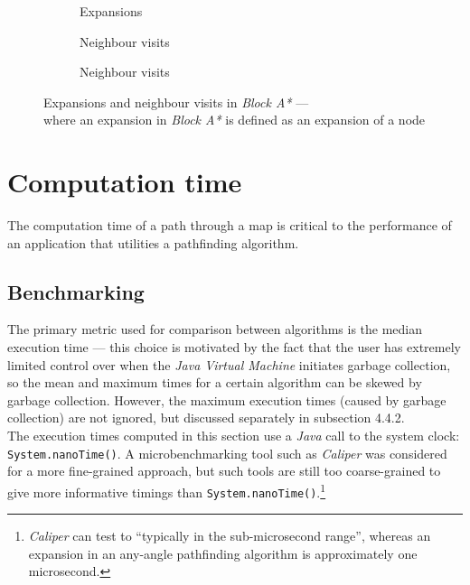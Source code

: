 \documentclass[12pt,notitlepage]{report}
\begin{document}
\begin{figure}
\centering
  \begin{subfigure}{0.32\textwidth}
  \centering
  
  \caption{Expansions}
  \end{subfigure}
  \begin{subfigure}{0.32\textwidth}
  \centering
  
  \caption{Neighbour visits}
  \end{subfigure}
  \begin{subfigure}{0.32\textwidth}
  \centering
  
  \caption{Neighbour visits}
  \end{subfigure}
\caption[Expansions and neighbour visits in Block A*]{Expansions and neighbour visits in {\em Block A*} --- \\ where an expansion in {\em Block A*} is defined as an expansion of a node}
\end{figure}

\section{Computation time}
The computation time of a path through a map is critical to the performance of an application that utilities a pathfinding algorithm.

\subsection{Benchmarking}
The primary metric used for comparison between algorithms is the median execution time --- this choice is motivated by the fact that the user has extremely limited control over when the {\em Java Virtual Machine} initiates garbage collection, so the mean and maximum times for a certain algorithm can be skewed by garbage collection. However, the maximum execution times (caused by garbage collection) are not ignored, but discussed separately in subsection 4.4.2.\\

\noindent
The execution times computed in this section use a {\em Java} call to the system clock: {\tt System.nanoTime()}. A microbenchmarking tool such as {\em Caliper}\cite{Caliper} was considered for a more fine-grained approach, but such tools are still too coarse-grained to give more informative timings than {\tt System.nanoTime()}.\footnote{{\em Caliper} can test to ``typically in the sub-microsecond range'', whereas an expansion in an any-angle pathfinding algorithm is approximately one microsecond.}
\end{document}
